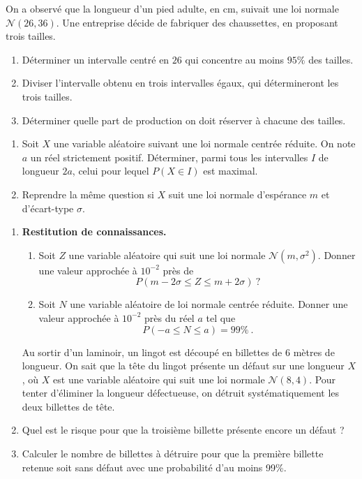 \documentclass[../PolyS4.tex]{subfiles}
\begin{document}



On a observé que la longueur d'un pied adulte, en cm, suivait une loi normale $\mathcal N(26,36)$. Une entreprise décide de fabriquer des chaussettes, en proposant trois tailles. 
\begin{enumerate}
\item Déterminer un intervalle centré en $26$ qui concentre au moins $95\%$ des tailles.
\item Diviser l'intervalle obtenu en trois intervalles égaux, qui détermineront les trois tailles.
\item Déterminer quelle part de production on doit réserver à chacune des tailles.\\
\end{enumerate}





\begin{enumerate}
\item Soit $X$ une variable aléatoire suivant une loi normale centrée réduite. On note $a$ un réel strictement positif. Déterminer, parmi tous les intervalles $I$ de longueur $2a$, celui pour lequel $P(X\in I)$ est maximal.
\item Reprendre la même question si $X$ suit une loi normale d'espérance $m$ et d'écart-type $\sigma$.\\
\end{enumerate}



\newpage


\begin{enumerate}
\item {\bf Restitution de connaissances.}
\begin{enumerate}[label=\alph*.]
\item Soit $Z$ une variable aléatoire qui suit une loi normale ${\mathcal N}(m,\sigma^2)$. Donner une valeur approchée à $10^{-2}$ près de  $$P(m-2\sigma\le Z\le m+2\sigma)\ ?$$
\item Soit $N$ une variable aléatoire de loi normale centrée réduite. Donner une valeur approchée à $10^{-2}$ près du réel $a$ tel que $$P(-a\le N\le a)=99\%\ .$$
\end{enumerate}
Au sortir d'un laminoir, un lingot est découpé en billettes de 6 mètres de longueur. On sait que la tête du lingot présente un défaut sur une longueur $X$, où $X$ est une variable aléatoire qui suit une loi normale ${\mathcal N}(8,4)$. Pour tenter d'éliminer la longueur défectueuse, on détruit systématiquement les deux billettes de tête.
\item Quel est le risque pour que la troisième billette présente encore un défaut ?
\item Calculer le nombre de billettes à détruire pour que la première billette retenue soit sans défaut avec une probabilité d'au moins 99\%.
\end{enumerate}
\end{document}
